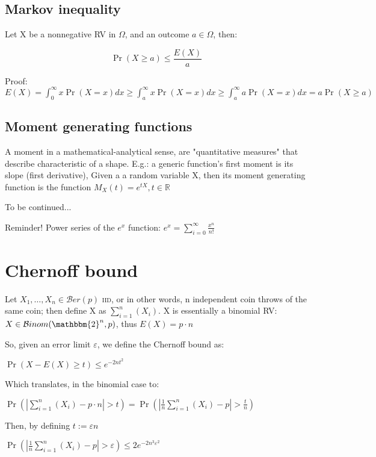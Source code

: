 \documentclass{report}
\newcommand{\binary}{\mathbbm{2}}
\newcommand{\binomdist}{\mathcal{B}inom}
\newcommand{\berdist}{\mathcal{B}er}
\newcommand{\iid}{\textsc{iid}}
\newcommand{\coin}{\berdist}
\begin{document}
\subsection{Markov inequality}
	
	Let X be a nonnegative RV in $\Omega$, and an outcome $a \in \Omega$, then:
	
	\begin{equation}
	\Pr(X \geq a) \leq \frac{E(X)}{a}
	\end{equation}
	
	Proof: $ E(X) = \int_{0}^{\infty}x\Pr(X=x)dx \geq \int_{a}^{\infty}x\Pr(X = x)dx \geq \int_{a}^{\infty}a\Pr(X = x)dx = a\Pr(X \geq a)$
	
\subsection{Moment generating functions}
	
	A moment in a mathematical-analytical sense, are "quantitative measures" that describe characteristic of a shape. E.g.: a generic function's first moment is its slope (first derivative), 
	Given a a random variable X, then its moment generating function is the function $M_X(t) = e^{tX}, t \in \mathbb{R}$
	
	To be continued...
	
	Reminder! Power series of the $e^x$ function: $\displaystyle e^x = \sum_{i=0}^{\infty}\frac{x^n}{n!}$
	
	
\section{Chernoff bound}
	
	Let $X_1, \dots, X_n \in \coin(p)$ \iid, or in other words, n independent coin throws of the same coin; then define X as $\sum_{i=1}^{n}(X_i)$. X is essentially a binomial RV: $X \in \binomdist(\binary^n, p)$, thus $E(X)=p\cdot n$
	
	So, given an error limit $\varepsilon$, we define the Chernoff bound as:
	
	$\displaystyle \Pr(X-E(X) \geq t)\leq e^{-2nt^2}$
	
	Which translates, in the binomial case to:
	
	$\displaystyle \Pr(|\sum_{i=1}^{n}(X_i) - p \cdot n| > t) = \Pr(|\frac{1}{n}\sum_{i=1}^{n}(X_i) - p| > \frac{t}{n})$

	Then, by defining $t := \varepsilon n$
	
	$\Pr(|\frac{1}{n}\sum_{i=1}^{n}(X_i) - p| > \varepsilon) \leq 2e^{-2n^3\varepsilon^2}$
	
\end{document}
